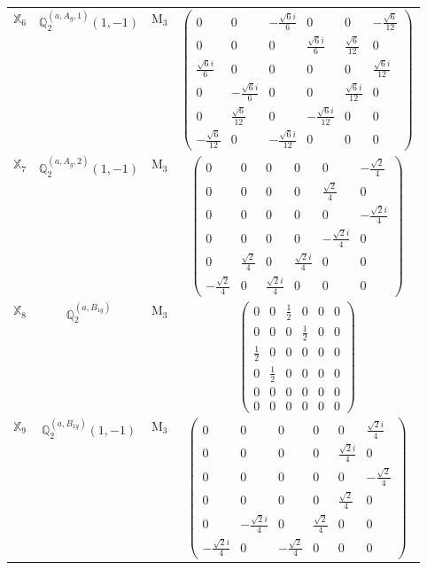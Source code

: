 \documentclass[fleqn,10pt,landscape]{article}
\begin{document}
\begin{itemize}
\begin{center}
\begin{longtable}{c|c|c|c}
$ \mathbb{X}_{6} $ & $\mathbb{Q}_{2}^{(a,A_{g},1)}(1,-1)$ & M$_{3}$ & $\begin{pmatrix} 0 & 0 & - \frac{\sqrt{6} i}{6} & 0 & 0 & - \frac{\sqrt{6}}{12} \\ 0 & 0 & 0 & \frac{\sqrt{6} i}{6} & \frac{\sqrt{6}}{12} & 0 \\ \frac{\sqrt{6} i}{6} & 0 & 0 & 0 & 0 & \frac{\sqrt{6} i}{12} \\ 0 & - \frac{\sqrt{6} i}{6} & 0 & 0 & \frac{\sqrt{6} i}{12} & 0 \\ 0 & \frac{\sqrt{6}}{12} & 0 & - \frac{\sqrt{6} i}{12} & 0 & 0 \\ - \frac{\sqrt{6}}{12} & 0 & - \frac{\sqrt{6} i}{12} & 0 & 0 & 0 \end{pmatrix}$ \\
$ \mathbb{X}_{7} $ & $\mathbb{Q}_{2}^{(a,A_{g},2)}(1,-1)$ & M$_{3}$ & $\begin{pmatrix} 0 & 0 & 0 & 0 & 0 & - \frac{\sqrt{2}}{4} \\ 0 & 0 & 0 & 0 & \frac{\sqrt{2}}{4} & 0 \\ 0 & 0 & 0 & 0 & 0 & - \frac{\sqrt{2} i}{4} \\ 0 & 0 & 0 & 0 & - \frac{\sqrt{2} i}{4} & 0 \\ 0 & \frac{\sqrt{2}}{4} & 0 & \frac{\sqrt{2} i}{4} & 0 & 0 \\ - \frac{\sqrt{2}}{4} & 0 & \frac{\sqrt{2} i}{4} & 0 & 0 & 0 \end{pmatrix}$ \\
$ \mathbb{X}_{8} $ & $\mathbb{Q}_{2}^{(a,B_{1g})}$ & M$_{3}$ & $\begin{pmatrix} 0 & 0 & \frac{1}{2} & 0 & 0 & 0 \\ 0 & 0 & 0 & \frac{1}{2} & 0 & 0 \\ \frac{1}{2} & 0 & 0 & 0 & 0 & 0 \\ 0 & \frac{1}{2} & 0 & 0 & 0 & 0 \\ 0 & 0 & 0 & 0 & 0 & 0 \\ 0 & 0 & 0 & 0 & 0 & 0 \end{pmatrix}$ \\
$ \mathbb{X}_{9} $ & $\mathbb{Q}_{2}^{(a,B_{1g})}(1,-1)$ & M$_{3}$ & $\begin{pmatrix} 0 & 0 & 0 & 0 & 0 & \frac{\sqrt{2} i}{4} \\ 0 & 0 & 0 & 0 & \frac{\sqrt{2} i}{4} & 0 \\ 0 & 0 & 0 & 0 & 0 & - \frac{\sqrt{2}}{4} \\ 0 & 0 & 0 & 0 & \frac{\sqrt{2}}{4} & 0 \\ 0 & - \frac{\sqrt{2} i}{4} & 0 & \frac{\sqrt{2}}{4} & 0 & 0 \\ - \frac{\sqrt{2} i}{4} & 0 & - \frac{\sqrt{2}}{4} & 0 & 0 & 0 \end{pmatrix}$ \\

\end{longtable}
\end{center}
\end{itemize}
\end{document}
